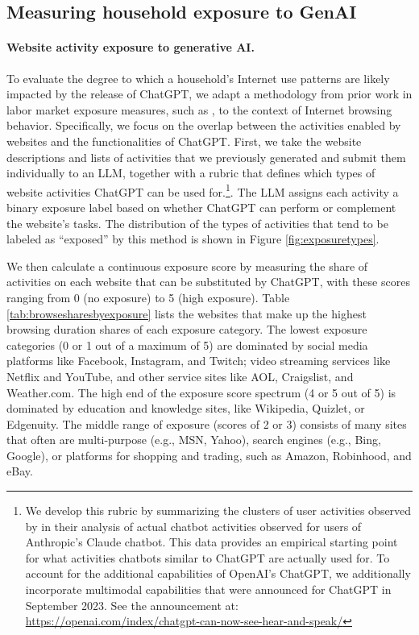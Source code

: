 \documentclass[12pt]{article}
\begin{document}

\subsection{Measuring household exposure to GenAI}
\paragraph{Website activity exposure to generative AI.} To evaluate the degree to which a household's Internet use patterns are likely impacted by the release of ChatGPT, we adapt a methodology from prior work in labor market exposure measures, such as \cite{eisfeldt2023}, to the context of Internet browsing behavior. Specifically, we focus on the overlap between the activities enabled by websites and the functionalities of ChatGPT. First, we take the website descriptions and lists of activities that we previously generated and submit them individually to an LLM, together with a rubric that defines which types of website activities ChatGPT can be used for.\footnote{We develop this rubric by summarizing the clusters of user activities observed by \cite{handa2025} in their analysis of actual chatbot activities observed for users of Anthropic's Claude chatbot. This data provides an empirical starting point for what activities chatbots similar to ChatGPT are actually used for. To account for the additional capabilities of OpenAI's ChatGPT, we additionally incorporate multimodal capabilities that were  announced for ChatGPT in September 2023. See the announcement at: \url{https://openai.com/index/chatgpt-can-now-see-hear-and-speak/}}. The LLM assigns each activity a binary exposure label based on whether ChatGPT can perform or complement the website’s tasks. The distribution of the types of activities that tend to be labeled as ``exposed'' by this method is shown in Figure \ref{fig:exposuretypes}.


We then calculate a continuous exposure score by measuring the share of activities on each website that can be substituted by ChatGPT, with these scores ranging from 0 (no exposure) to 5 (high exposure). Table \ref{tab:browsesharesbyexposure} lists the websites that make up the highest browsing duration shares of each exposure category. The lowest exposure categories (0 or 1 out of a maximum of 5) are dominated by social media platforms like Facebook, Instagram, and Twitch; video streaming services like Netflix and YouTube, and other service sites like AOL, Craigslist, and Weather.com. The high end of the exposure score spectrum (4 or 5 out of 5) is dominated by education and knowledge sites, like Wikipedia, Quizlet,  or Edgenuity. The middle range of exposure (scores of 2 or 3) consists of many sites that often are multi-purpose (e.g., MSN, Yahoo), search engines  (e.g., Bing, Google), or platforms for shopping and trading, such as Amazon, Robinhood, and eBay.
\end{document}
